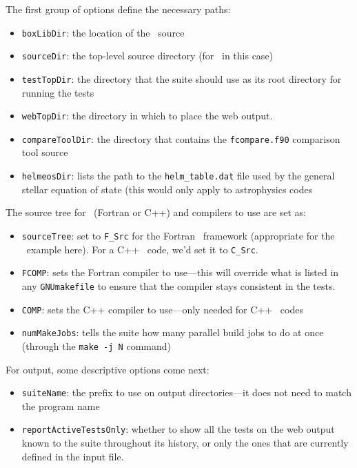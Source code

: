 The first group of options define the necessary paths:
\begin{itemize}
\item {\tt boxLibDir}: the location of the \boxlib\ source
\item {\tt sourceDir}: the top-level source directory (for \maestro\ in this case)
\item {\tt testTopDir}: the directory that the suite should use as its
  root directory for running the tests
\item {\tt webTopDir}: the directory in which to place the web output.
\item {\tt compareToolDir}: the directory that contains the {\tt fcompare.f90}
  comparison tool source
\item {\tt helmeosDir}: lists the path to the {\tt helm\_table.dat}
  file used by the general stellar equation of state (this would only
  apply to astrophysics codes
\end{itemize}

The source tree for \boxlib\ (Fortran or C++) and compilers to use are set
as:
\begin{itemize}
\item {\tt sourceTree}: set to {\tt F\_Src} for the Fortran
  \boxlib\ framework (appropriate for the \maestro\ example here). For
  a C++ \boxlib\ code, we'd set it to {\tt C\_Src}.
\item {\tt FCOMP}: sets the Fortran compiler to use---this will
  override what is listed in any {\tt GNUmakefile} to ensure that the
  compiler stays consistent in the tests.
\item {\tt COMP}: sets the C++ compiler to use---only needed for C++
  \boxlib\ codes
\item {\tt numMakeJobs}: tells the suite how many parallel build
  jobs to do at once (through the {\tt make -j N} command)
\end{itemize}

For output, some descriptive options come next:
\begin{itemize}
\item {\tt suiteName}: the prefix to use on output directories---it
  does not need to match the program name
\item {\tt reportActiveTestsOnly}: whether to show all the tests on
  the web output known  to the suite throughout its history, or
  only the ones that are currently defined in the input file.
\end{itemize}


